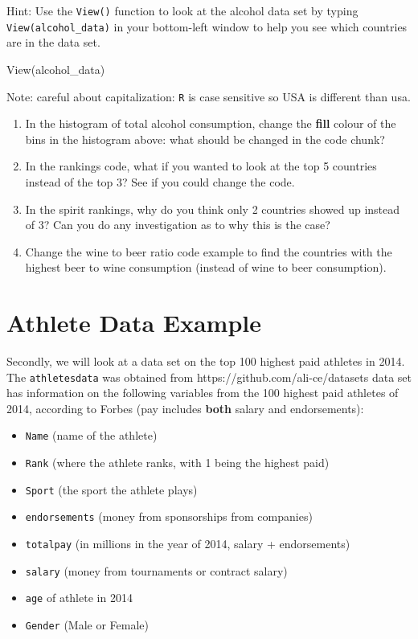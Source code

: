 \documentclass[
]{book}
\newenvironment{Shaded}{\begin{snugshade}}{\end{snugshade}}
\newcommand{\FunctionTok}[1]{\textcolor[rgb]{0.00,0.00,0.00}{#1}}
\newcommand{\NormalTok}[1]{#1}
\providecommand{\tightlist}{%
  \setlength{\itemsep}{0pt}\setlength{\parskip}{0pt}}
\begin{document}
Hint: Use the \texttt{View()} function to look at the alcohol data set by typing \texttt{View(alcohol\_data)} in your bottom-left window to help you see which countries are in the data set.

\begin{Shaded}
\begin{Highlighting}[]
\FunctionTok{View}\NormalTok{(alcohol\_data)}
\end{Highlighting}
\end{Shaded}

Note: careful about capitalization: \texttt{R} is case sensitive so USA is different than usa.

\begin{enumerate}
\def\labelenumi{\arabic{enumi}.}
\setcounter{enumi}{2}
\item
  In the histogram of total alcohol consumption, change the \textbf{fill} colour of the bins in the histogram above: what should be changed in the code chunk?
\item
  In the rankings code, what if you wanted to look at the top 5 countries instead of the top 3? See if you could change the code.
\item
  In the spirit rankings, why do you think only 2 countries showed up instead of 3? Can you do any investigation as to why this is the case?
\item
  Change the wine to beer ratio code example to find the countries with the highest beer to wine consumption (instead of wine to beer consumption).
\end{enumerate}

\hypertarget{athlete-data-example}{%
\section{Athlete Data Example}\label{athlete-data-example}}

Secondly, we will look at a data set on the top 100 highest paid athletes in 2014. The \texttt{athletesdata} was obtained from https://github.com/ali-ce/datasets data set has information on the following variables from the 100 highest paid athletes of 2014, according to Forbes (pay includes \textbf{both} salary and endorsements):

\begin{itemize}
\tightlist
\item
  \texttt{Name} (name of the athlete)
\item
  \texttt{Rank} (where the athlete ranks, with 1 being the highest paid)
\item
  \texttt{Sport} (the sport the athlete plays)
\item
  \texttt{endorsements} (money from sponsorships from companies)
\item
  \texttt{totalpay} (in millions in the year of 2014, salary + endorsements)
\item
  \texttt{salary} (money from tournaments or contract salary)
\item
  \texttt{age} of athlete in 2014
\item
  \texttt{Gender} (Male or Female)
\end{itemize}
\end{document}
